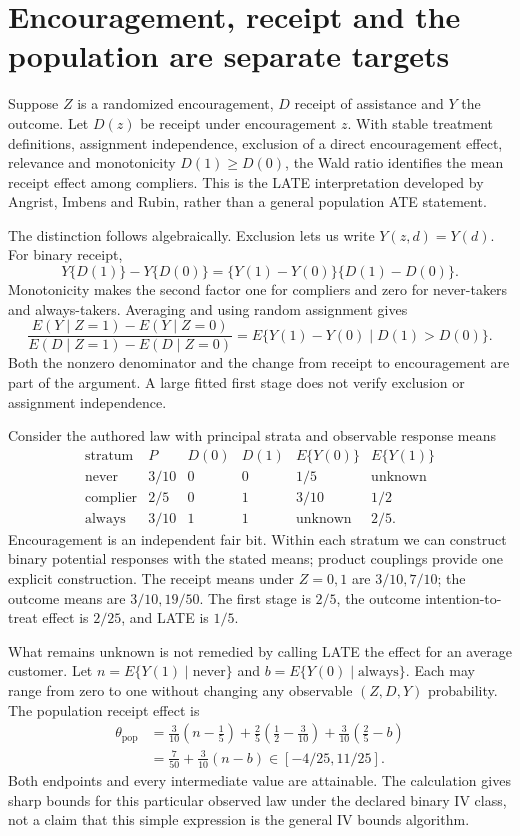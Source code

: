 \section{Encouragement, receipt and the population are separate targets}
\label{exec17:s3-iv}

Suppose $Z$ is a randomized encouragement, $D$ receipt of assistance
and $Y$ the outcome. Let $D(z)$ be receipt under encouragement
$z$. With stable treatment definitions, assignment independence,
exclusion of a direct encouragement effect, relevance and
monotonicity $D(1)\ge D(0)$, the Wald ratio identifies the mean
receipt effect among compliers. This is the LATE interpretation
developed by Angrist, Imbens and Rubin, rather than a general
population ATE statement.~\citep{angrist1996}

The distinction follows algebraically. Exclusion lets us write
$Y(z,d)=Y(d)$. For binary receipt,
\[
 Y\{D(1)\}-Y\{D(0)\}
   =\{Y(1)-Y(0)\}\{D(1)-D(0)\}.
\]
Monotonicity makes the second factor one for compliers and zero
for never-takers and always-takers. Averaging and using
random assignment gives
\[
 \frac{E(Y\mid Z=1)-E(Y\mid Z=0)}
      {E(D\mid Z=1)-E(D\mid Z=0)}
 =E\{Y(1)-Y(0)\mid D(1)>D(0)\}.
\]
Both the nonzero denominator and the change from receipt to
encouragement are part of the argument. A large fitted first
stage does not verify exclusion or assignment
independence.~\citep{angrist1996}

Consider the authored law with principal strata and observable
response means
\[
\begin{array}{c|c|cc|cc}
 \text{stratum}&P&D(0)&D(1)&E\{Y(0)\}&E\{Y(1)\}\\ \hline
 \text{never}&3/10&0&0&1/5&\text{unknown}\\
 \text{complier}&2/5&0&1&3/10&1/2\\
 \text{always}&3/10&1&1&\text{unknown}&2/5 .
\end{array}
\]
Encouragement is an independent fair bit. Within each stratum
we can construct binary potential responses with the stated
means; product couplings provide one explicit construction.
The receipt means under $Z=0,1$ are $3/10,7/10$;
the outcome means are $3/10,19/50$. The first stage is $2/5$,
the outcome intention-to-treat effect is $2/25$, and LATE is
$1/5$.~\citep{exec17_s3_exact}

What remains unknown is not remedied by calling LATE the effect
for an average customer. Let $n=E\{Y(1)\mid\text{never}\}$
and $b=E\{Y(0)\mid\text{always}\}$. Each may range from zero
to one without changing any observable $(Z,D,Y)$ probability.
The population receipt effect is
\begin{align*}
 \theta_{\mathrm{pop}}
 &=\tfrac3{10}(n-\tfrac15)
   +\tfrac25(\tfrac12-\tfrac3{10})
   +\tfrac3{10}(\tfrac25-b)\\
 &=\tfrac7{50}+\tfrac3{10}(n-b)
   \in[-4/25,11/25].
\end{align*}
Both endpoints and every intermediate value are attainable.
The calculation gives sharp bounds for this particular observed
law under the declared binary IV class, not a claim that this
simple expression is the general IV bounds algorithm.


